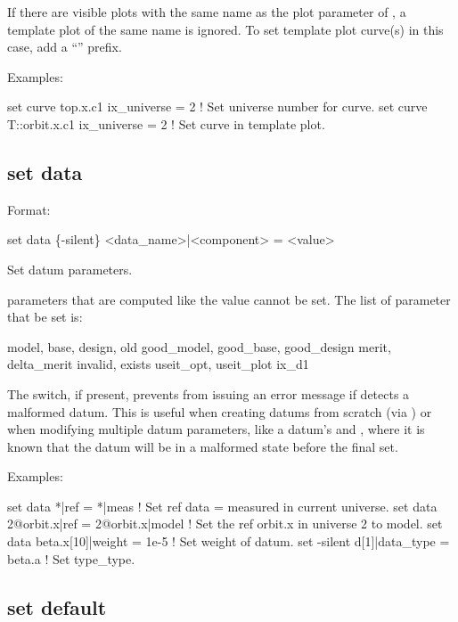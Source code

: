 {{{If there are visible plots with the same name as the plot parameter of , a template plot
of the same name is ignored. To set template plot curve(s) in this case, add a ``'' prefix.

Examples:
\begin{example}
  set curve top.x.c1 ix_universe = 2       ! Set universe number for curve.
  set curve T::orbit.x.c1 ix_universe = 2  ! Set curve in template plot.
\end{example}


\subsection{set data}
\label{s:set.data}

Format:
\begin{example}
  set data \{-silent\} <data_name>|<component> = <value>
\end{example}
Set datum parameters.

parameters that are computed like the  value cannot be set. The list of parameter
that  be set is:
\begin{example}
  model, base, design, old
  good_model, good_base, good_design
  merit, delta_merit
  invalid, exists
  useit_opt, useit_plot
  ix_d1
\end{example}

The  switch, if present, prevents \tao from issuing an error message if \tao detects a
malformed datum. This is useful when creating datums from scratch (via )
or when modifying multiple datum parameters, like a datum's  and ,
where it is known that the datum will be in a malformed state before the final set.

Examples:
\begin{example}
  set data *|ref = *|meas              ! Set ref data = measured in current universe.
  set data 2@orbit.x|ref = 2@orbit.x|model 
                                       ! Set the ref orbit.x in universe 2 to model.
  set data beta.x[10]|weight = 1e-5    ! Set weight of datum.
  set -silent d[1]|data_type = beta.a  ! Set type_type.
\end{example}


\subsection{set default}
\label{s:set.default}

}}}
